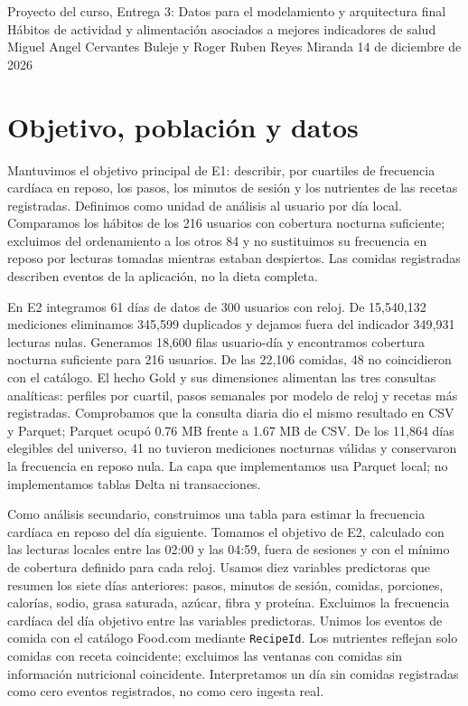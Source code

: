 \documentclass[11pt]{article}
\begin{document}
{Proyecto del curso, Entrega 3: Datos para el modelamiento y arquitectura final}
{Hábitos de actividad y alimentación asociados a mejores indicadores de salud}
{Miguel Angel Cervantes Buleje y Roger Ruben Reyes Miranda}
{14 de diciembre de 2026}

\section{Objetivo, población y datos}
Mantuvimos el objetivo principal de E1: describir, por cuartiles de frecuencia cardíaca en reposo, los pasos, los minutos de sesión y los nutrientes de las recetas registradas. Definimos como unidad de análisis al usuario por día local. Comparamos los hábitos de los 216 usuarios con cobertura nocturna suficiente; excluimos del ordenamiento a los otros 84 y no sustituimos su frecuencia en reposo por lecturas tomadas mientras estaban despiertos. Las comidas registradas describen eventos de la aplicación, no la dieta completa.

En E2 integramos 61 días de datos de 300 usuarios con reloj. De 15,540,132 mediciones eliminamos 345,599 duplicados y dejamos fuera del indicador 349,931 lecturas nulas. Generamos 18,600 filas usuario-día y encontramos cobertura nocturna suficiente para 216 usuarios. De las 22,106 comidas, 48 no coincidieron con el catálogo. El hecho Gold y sus dimensiones alimentan las tres consultas analíticas: perfiles por cuartil, pasos semanales por modelo de reloj y recetas más registradas. Comprobamos que la consulta diaria dio el mismo resultado en CSV y Parquet; Parquet ocupó 0.76 MB frente a 1.67 MB de CSV. De los 11,864 días elegibles del universo, 41 no tuvieron mediciones nocturnas válidas y conservaron la frecuencia en reposo nula. La capa que implementamos usa Parquet local; no implementamos tablas Delta ni transacciones.

Como análisis secundario, construimos una tabla para estimar la frecuencia cardíaca en reposo del día siguiente. Tomamos el objetivo de E2, calculado con las lecturas locales entre las 02:00 y las 04:59, fuera de sesiones y con el mínimo de cobertura definido para cada reloj. Usamos diez variables predictoras que resumen los siete días anteriores: pasos, minutos de sesión, comidas, porciones, calorías, sodio, grasa saturada, azúcar, fibra y proteína. Excluimos la frecuencia cardíaca del día objetivo entre las variables predictoras. Unimos los eventos de comida con el catálogo Food.com mediante \texttt{RecipeId}. Los nutrientes reflejan solo comidas con receta coincidente; excluimos las ventanas con comidas sin información nutricional coincidente. Interpretamos un día sin comidas registradas como cero eventos registrados, no como cero ingesta real.
\end{document}
